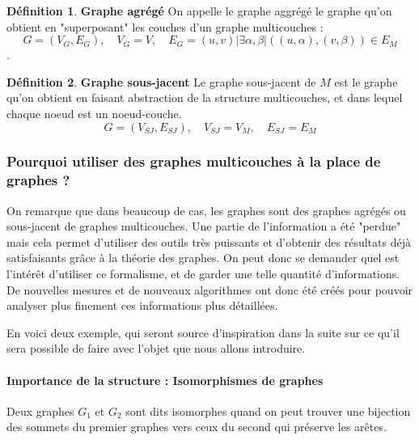\documentclass[11pt,a4paper]{article}
\theoremstyle{definition}
\newtheorem{defn}{Définition}
\theoremstyle{remark}
\theoremstyle{remark}
\begin{document}
\begin{defn}{\textbf{Graphe agrégé}}
	On appelle le graphe aggrégé le graphe qu'on obtient en "superposant" les couches d'un graphe multicouches : $$G=(V_G,E_G), \quad V_G=V, \quad E_G={(u,v)|\exists \alpha, \beta | ((u,\alpha),(v,\beta)) \in E_M}$$.
\end{defn}

\begin{defn}{\textbf{Graphe sous-jacent}}
Le graphe sous-jacent de $M$ est le graphe qu'on obtient en faisant abstraction de la structure multicouches, et dans lequel chaque noeud est un noeud-couche.
$$G=(V_{SJ},E_{SJ}), \quad V_{SJ} = V_M, \quad E_{SJ}=E_M$$
\end{defn}




\subsubsection{Pourquoi utiliser des graphes multicouches à la place de graphes ?}

On remarque que dans beaucoup de cas, les graphes sont des graphes agrégés ou sous-jacent de graphes multicouches. Une partie de l'information a été "perdue" mais cela permet d'utiliser des outils très puissants et d'obtenir des résultats déjà satisfaisants grâce à la théorie des graphes. On peut donc se demander quel est l'intérêt d'utiliser ce formalisme, et de garder une telle quantité d'informations. De nouvelles mesures et de nouveaux algorithmes ont donc été créés pour pouvoir analyser plus finement ces informations plus détaillées.

En voici deux exemple, qui seront source d'inspiration dans la suite sur ce qu'il sera possible de faire avec l'objet que nous allons introduire.


\paragraph{Importance de la structure : Isomorphismes de graphes}

Deux graphes $G_1$ et $G_2$ sont dits isomorphes quand on peut trouver une bijection des sommets du premier graphes vers ceux du second qui préserve les arêtes.
\end{document}
